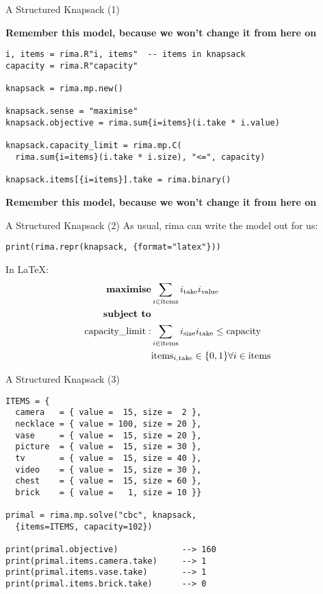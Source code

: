 \documentclass[smaller,handout]{beamer}
\begin{document}
\begin{frame}[fragile]{A Structured Knapsack (1)}
\begin{overprint}
  \bf{Remember this model, because we won't change it from here on}

  \begin{lstlisting}
i, items = rima.R"i, items"  -- items in knapsack
capacity = rima.R"capacity"

knapsack = rima.mp.new()
 
knapsack.sense = "maximise"
knapsack.objective = rima.sum{i=items}(i.take * i.value)

knapsack.capacity_limit = rima.mp.C(
  rima.sum{i=items}(i.take * i.size), "<=", capacity)

knapsack.items[{i=items}].take = rima.binary()
  \end{lstlisting}

  \bf{Remember this model, because we won't change it from here on}
  \end{overprint}
\end{frame}


\begin{frame}[fragile]{A Structured Knapsack (2)}
  As usual, rima can write the model out for us:
  \begin{lstlisting}
print(rima.repr(knapsack, {format="latex"}))
  \end{lstlisting}

  In \LaTeX:
\begin{align*}
\text{\bf maximise} & \sum_{i \in \text{items}} i_{\text{take}} i_{\text{value}} \\
\text{\bf subject to} \\
\text{capacity\_limit}: & \sum_{i \in \text{items}} i_{\text{size}} i_{\text{take}} \leq \text{capacity} \\
& \text{items}_{i,\text{take}} \in \{0, 1\} \forall i \in \text{items}\\
\end{align*}

\end{frame}



\begin{frame}[fragile]{A Structured Knapsack (3)}
  \begin{lstlisting}
ITEMS = {
  camera   = { value =  15, size =  2 },
  necklace = { value = 100, size = 20 },
  vase     = { value =  15, size = 20 },
  picture  = { value =  15, size = 30 },
  tv       = { value =  15, size = 40 },
  video    = { value =  15, size = 30 },
  chest    = { value =  15, size = 60 },
  brick    = { value =   1, size = 10 }}

primal = rima.mp.solve("cbc", knapsack,
  {items=ITEMS, capacity=102})

print(primal.objective)             --> 160
print(primal.items.camera.take)     --> 1
print(primal.items.vase.take)       --> 1
print(primal.items.brick.take)      --> 0
  \end{lstlisting}
\end{frame}
\end{document}
